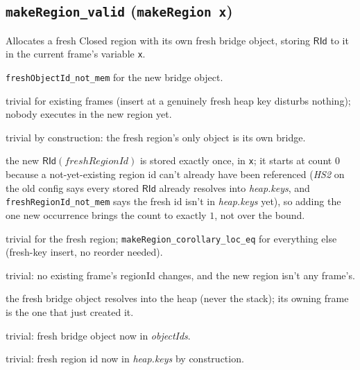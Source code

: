 \documentclass[11pt]{article}
\newcommand{\op}[1]{\texttt{#1}}
\newcommand{\thm}[1]{\textbf{\texttt{#1}}}
\begin{document}
\subsection{\thm{makeRegion\_valid} (\op{makeRegion x})}
Allocates a fresh Closed region with its own fresh bridge object, storing $\mathsf{RId}$ to it in
the current frame's variable \texttt{x}.
\begin{description}[nosep]
  \item[L1] \texttt{freshObjectId\_not\_mem} for the new bridge object.
  \item[L2] trivial for existing frames (insert at a genuinely fresh heap key disturbs nothing);
    nobody executes in the new region yet.
  \item[H1] trivial by construction: the fresh region's only object is its own bridge.
  \item[H2] the new $\mathsf{RId}(\mathit{freshRegionId})$ is stored exactly once, in
    \texttt{x}; it starts at count $0$ because a not-yet-existing region id can't already have been
    referenced (\textit{HS2} on the old config says every stored $\mathsf{RId}$ already resolves
    into \textit{heap.keys}, and \texttt{freshRegionId\_not\_mem} says the fresh id isn't in
    \textit{heap.keys} yet), so adding the one new occurrence brings the count to exactly $1$, not
    over the bound.
  \item[H3] trivial for the fresh region; \texttt{makeRegion\_corollary\_loc\_eq} for everything
    else (fresh-key insert, no reorder needed).
  \item[S1] trivial: no existing frame's regionId changes, and the new region isn't any frame's.
  \item[S2, S3] the fresh bridge object resolves into the heap (never the stack); its owning
    frame is the one that just created it.
  \item[HS1] trivial: fresh bridge object now in \textit{objectIds}.
  \item[HS2] trivial: fresh region id now in \textit{heap.keys} by construction.
\end{description}
\end{document}
